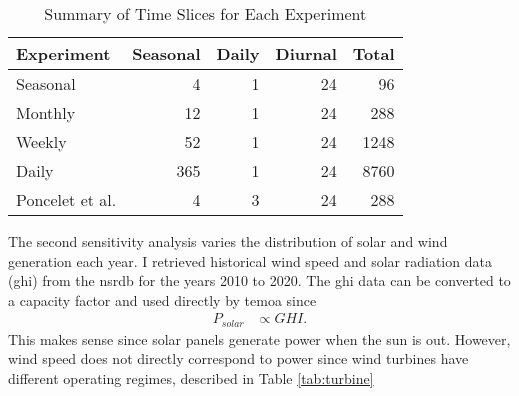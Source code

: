 \begin{table}[H]
  \centering
  \caption{Summary of Time Slices for Each Experiment}
  \label{tab:time-slice}
  \begin{tabular}{lrrrr}
    \toprule
    Experiment & Seasonal & Daily & Diurnal & Total\\
    \midrule
    Seasonal & 4 & 1 & 24 & 96\\
    Monthly & 12 & 1 & 24 & 288\\
    Weekly & 52 & 1 & 24 & 1248\\
    Daily & 365 & 1 & 24 & 8760\\
    \midrule
    Poncelet et al. \cite{poncelet_impact_2016} & 4 & 3 &  24 & 288\\
    \bottomrule
  \end{tabular}
\end{table}

The second sensitivity analysis varies the distribution of solar and wind generation
each year. I retrieved historical wind speed and solar radiation data (\gls{ghi})
from the \gls{nsrdb} \cite{sengupta_national_2018} for the years 2010 to 2020.
The \gls{ghi} data can be converted to a capacity factor and used directly by
\gls{temoa} since
\begin{align}
  P_{solar} &\propto GHI.
\end{align}
This makes sense since solar panels generate power when the sun is out. However,
wind speed does not directly correspond to power since wind turbines have different
operating regimes, described in Table \ref{tab:turbine}

\begin{table}[H]
  \centering
  \caption{Summary of Wind Turbine Data}
  \label{tab:turbine}

\end{table}

